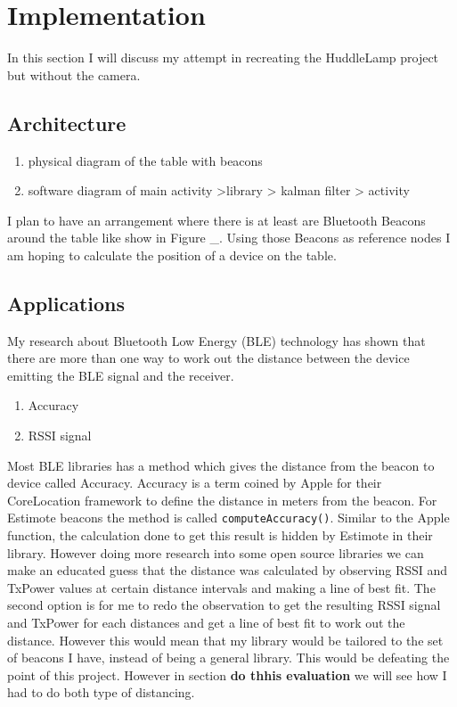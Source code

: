 \section{Implementation}

In this section I will discuss my attempt in recreating the HuddleLamp project but without the camera. 


\subsection{Architecture} \label{nocamer_architecture}
 \begin{enumerate}
 \item physical diagram of the table with beacons
 \item software diagram of main activity \-\->library \-\-> kalman filter \-\-> activity
 \end{enumerate}
 I plan to have an arrangement where there is at least are Bluetooth Beacons around the table like show in Figure \_. Using those Beacons as reference nodes I am hoping to calculate the position of a device on the table.

\subsection{Applications}
My research about Bluetooth Low Energy (BLE) technology has shown that there are more than one way to work out the distance between the device emitting the BLE signal and the receiver. 
\begin{enumerate}
\item Accuracy
\item RSSI signal
\end{enumerate}
Most BLE libraries has a method which gives the distance from the beacon to device called Accuracy. Accuracy is a term coined by Apple for their CoreLocation framework to define the distance in meters from the beacon. For Estimote beacons the method is called  \lstinline|computeAccuracy()|. Similar to the Apple function, the calculation done to get this result is hidden by Estimote in their library. However doing more research into some open source libraries \cite{radius-ranging, android_ibeacon_alt} we can make an educated guess that the distance was calculated by observing RSSI and TxPower values at certain distance intervals and making a line of best fit.
The second option is for me to redo the observation to get the resulting RSSI signal and TxPower for each distances and get a line of best fit to work out the distance. However this would mean that my library would be tailored to the set of beacons I have, instead of being a general library. This would be defeating the point of this project. However in section \textbf{do thhis evaluation} we will see how I had to do both type of distancing.

